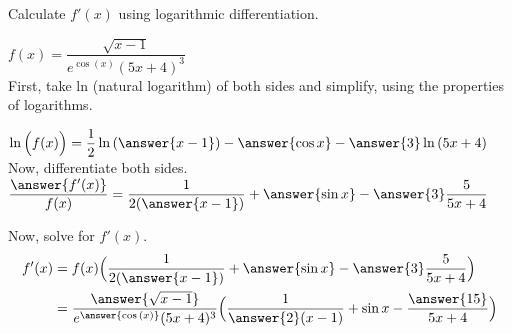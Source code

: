 \documentclass{ximera}
\author{Nela Lakos}
\begin{document}
\begin{exercise}

Calculate $f'(x)$ using logarithmic differentiation. 

 $f(x)=\dfrac{\sqrt{x-1}}{e^{\cos{(x)}}(5x+4)^3}$\\

First, take ln (natural logarithm) of both sides and simplify, using the properties of logarithms.

$\ln{\Bigl(f(x)\Bigr)}=
\dfrac{1}{2}\ln{(\answer{x-1})}-\answer{\cos{x}}-\answer{3}\ln{(5x+4)}$ \\

Now, differentiate both sides.\\

   $ \dfrac{\answer{f'(x)}}{f(x)} =\dfrac{1}{2(\answer{x-1})}+\answer{\sin{x}}-\answer{3}\dfrac{5}{5x+4}$

Now, solve for $f'(x)$.
\begin{align*}
f'(x)&=f(x)\Bigl(\dfrac{1}{2(\answer{x-1})}+\answer{\sin{x}}-\answer{3}\dfrac{5}{5x+4}\Bigr)\\
&=\dfrac{\answer{\sqrt{x-1}}}{e^{\answer{\cos{(x)}}}(5x+4)^3}\Bigl(\dfrac{1}{\answer{2}(x-1)}+\sin{x}-\dfrac{\answer{15}}{5x+4}\Bigr)
\end{align*}
\end{exercise}
\end{document}
